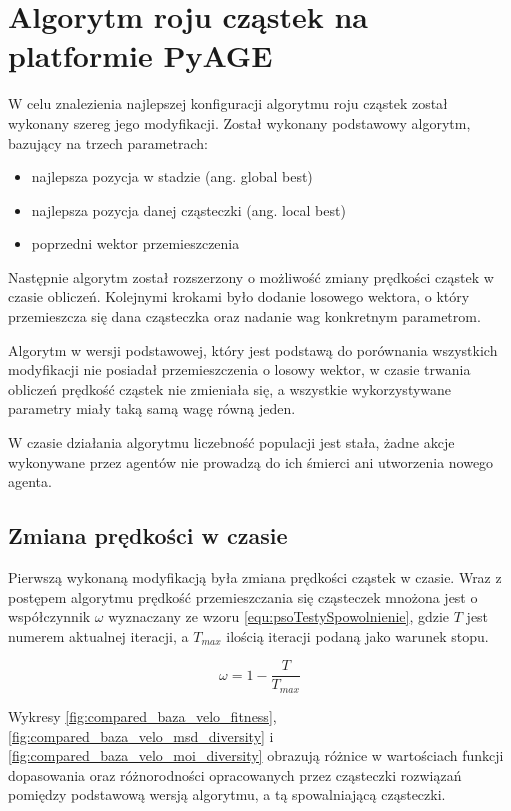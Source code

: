 \chapter{Algorytm roju cząstek na platformie PyAGE}
\label{cha:psoTesty}

W celu znalezienia najlepszej konfiguracji algorytmu roju cząstek został wykonany szereg jego modyfikacji. Został wykonany podstawowy algorytm, bazujący na trzech parametrach:
\begin{itemize}
\item najlepsza pozycja w stadzie (ang. global best) 
\item najlepsza pozycja danej cząsteczki (ang. local best)
\item poprzedni wektor przemieszczenia
\end{itemize}

Następnie algorytm został rozszerzony o możliwość zmiany prędkości cząstek w czasie obliczeń. Kolejnymi krokami było dodanie losowego wektora, o który przemieszcza się dana cząsteczka oraz nadanie wag konkretnym parametrom. 

Algorytm w wersji podstawowej, który jest podstawą do porównania wszystkich modyfikacji nie posiadał przemieszczenia o losowy wektor, w czasie trwania obliczeń prędkość cząstek nie zmieniała się, a wszystkie wykorzystywane parametry miały taką samą wagę równą jeden.

W czasie działania algorytmu liczebność populacji jest stała, żadne akcje wykonywane przez agentów nie prowadzą do ich śmierci ani utworzenia nowego agenta.


\section{Zmiana prędkości w czasie}
\label{sec:psotestyspowolnienie}

Pierwszą wykonaną modyfikacją była zmiana prędkości cząstek w czasie. Wraz z postępem algorytmu prędkość przemieszczania się cząsteczek mnożona jest o współczynnik $\omega$ wyznaczany ze wzoru \ref{equ:psoTestySpowolnienie}, gdzie $T$ jest numerem aktualnej iteracji, a $T_{max}$ ilością iteracji podaną jako warunek stopu.

\begin{equation}
\label{equ:psoTestySpowolnienie}
\omega = 1 - \frac{T}{T_{max}}
\end{equation}

Wykresy \ref{fig:compared_baza_velo_fitness}, \ref{fig:compared_baza_velo_msd_diversity} i \ref{fig:compared_baza_velo_moi_diversity} obrazują różnice w wartościach funkcji dopasowania oraz różnorodności opracowanych przez cząsteczki rozwiązań pomiędzy podstawową wersją algorytmu, a tą spowalniającą cząsteczki.


